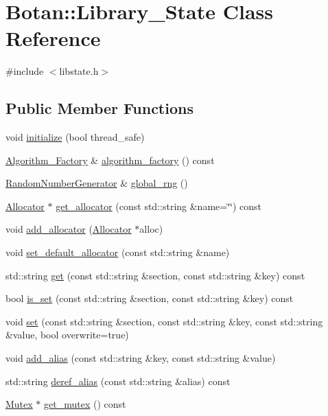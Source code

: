 \hypertarget{classBotan_1_1Library__State}{\section{Botan\-:\-:Library\-\_\-\-State Class Reference}
\label{classBotan_1_1Library__State}
}


{\ttfamily \#include $<$libstate.\-h$>$}

\subsection*{Public Member Functions}
\begin{DoxyCompactItemize}
\item 
void \hyperlink{classBotan_1_1Library__State_a7b33019f30fc335fc0370a6b7a61c134}{initialize} (bool thread\-\_\-safe)
\item 
\hyperlink{classBotan_1_1Algorithm__Factory}{Algorithm\-\_\-\-Factory} \& \hyperlink{classBotan_1_1Library__State_ad1f7515d62ceee23fabfa57ed58b1d73}{algorithm\-\_\-factory} () const 
\item 
\hyperlink{classBotan_1_1RandomNumberGenerator}{Random\-Number\-Generator} \& \hyperlink{classBotan_1_1Library__State_a0eee5b2194fb5741a5077495cf225a9d}{global\-\_\-rng} ()
\item 
\hyperlink{classBotan_1_1Allocator}{Allocator} $\ast$ \hyperlink{classBotan_1_1Library__State_a6909c66c9e8895b07b27b05afcc1179b}{get\-\_\-allocator} (const std\-::string \&name=\char`\"{}\char`\"{}) const 
\item 
void \hyperlink{classBotan_1_1Library__State_a4c9cd3323bbc52651a9eac13aaa26723}{add\-\_\-allocator} (\hyperlink{classBotan_1_1Allocator}{Allocator} $\ast$alloc)
\item 
void \hyperlink{classBotan_1_1Library__State_a109c8aabc7a7baa1579e8807a293a705}{set\-\_\-default\-\_\-allocator} (const std\-::string \&name)
\item 
std\-::string \hyperlink{classBotan_1_1Library__State_a7398379cc15a784ed6c6042896bd25b4}{get} (const std\-::string \&section, const std\-::string \&key) const 
\item 
bool \hyperlink{classBotan_1_1Library__State_a7fd75a2f6ed45569afbd2ea2c68ae7f6}{is\-\_\-set} (const std\-::string \&section, const std\-::string \&key) const 
\item 
void \hyperlink{classBotan_1_1Library__State_ae9477d7b4d558509f151d7cedae55c4a}{set} (const std\-::string \&section, const std\-::string \&key, const std\-::string \&value, bool overwrite=true)
\item 
void \hyperlink{classBotan_1_1Library__State_a2abbd11d58a10f5a81b658dda2c5cd8c}{add\-\_\-alias} (const std\-::string \&key, const std\-::string \&value)
\item 
std\-::string \hyperlink{classBotan_1_1Library__State_ab9bfabb98d82f45e4de8e8e2acc049d3}{deref\-\_\-alias} (const std\-::string \&alias) const 
\item 
\hyperlink{classBotan_1_1Mutex}{Mutex} $\ast$ \hyperlink{classBotan_1_1Library__State_a7e941c2774795de6b9daf9c410e6f9f3}{get\-\_\-mutex} () const 
\end{DoxyCompactItemize}


